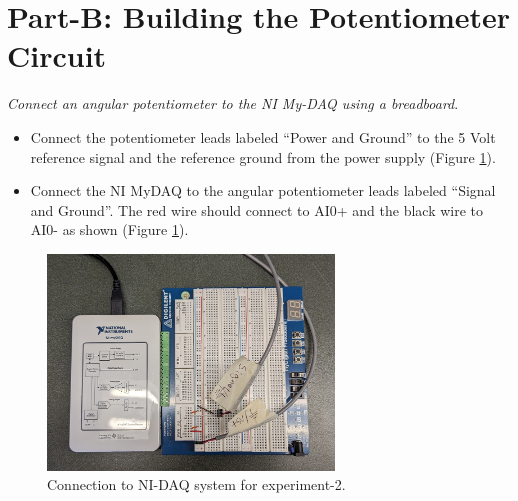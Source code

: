 \documentclass{article} %
\begin{document}
\section{Part-B: Building the Potentiometer Circuit }
\emph{Connect an angular potentiometer to the NI My-DAQ using a breadboard}.
\begin{itemize}
\item Connect the potentiometer leads labeled “Power and Ground” to the 5 Volt reference signal and the reference ground from the power supply (Figure \ref{fig:fig02}).
\item Connect the NI MyDAQ to the angular potentiometer leads labeled “Signal and Ground”. The red wire should connect to AI0+ and the black wire to AI0- as shown (Figure  \ref{fig:fig02}).
\end{itemize}

\begin{figure}[!ht]
\centering
\includegraphics[width=3.00in]{Fig01new.jpg}
\caption{Connection to NI-DAQ system for experiment-2.}
\label{fig:fig02}
\end{figure}
\end{document}
